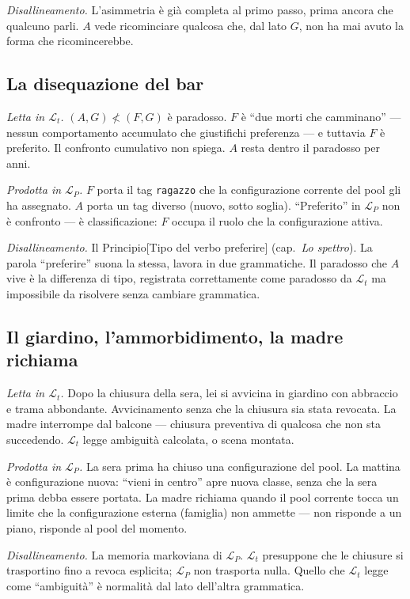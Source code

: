 \documentclass[
    oneside,                 %
    openany,                 %
    titlepage,
    11pt,
    a4paper,
    italian,
    DIV=14,                  %
    headinclude,
    footinclude=true,
    cleardoublepage=empty
]{scrbook}
\theoremstyle{ctplain}
\theoremstyle{ctdef}
\theoremstyle{ctrem}
\newcommand{\Lt}{\mathcal{L}_t}
\newcommand{\LP}{\mathcal{L}_P}
\begin{document}
\emph{Disallineamento.} L'asimmetria è già completa al primo passo, prima ancora che qualcuno parli. $A$ vede ricominciare qualcosa che, dal lato $G$, non ha mai avuto la forma che ricomincerebbe.

\subsection*{La disequazione del bar}

\emph{Letta in $\Lt$.} $(A,G) \not< (F,G)$ è paradosso. $F$ è ``due morti che camminano'' --- nessun comportamento accumulato che giustifichi preferenza --- e tuttavia $F$ è preferito. Il confronto cumulativo non spiega. $A$ resta dentro il paradosso per anni.

\emph{Prodotta in $\LP$.} $F$ porta il tag \texttt{ragazzo} che la configurazione corrente del pool gli ha assegnato. $A$ porta un tag diverso (nuovo, sotto soglia). ``Preferito'' in $\LP$ non è confronto --- è classificazione: $F$ occupa il ruolo che la configurazione attiva.

\emph{Disallineamento.} Il Principio[Tipo del verbo preferire] (cap.~\emph{Lo spettro}). La parola ``preferire'' suona la stessa, lavora in due grammatiche. Il paradosso che $A$ vive è la differenza di tipo, registrata correttamente come paradosso da $\Lt$ ma impossibile da risolvere senza cambiare grammatica.

\subsection*{Il giardino, l'ammorbidimento, la madre richiama}

\emph{Letta in $\Lt$.} Dopo la chiusura della sera, lei si avvicina in giardino con abbraccio e trama abbondante. Avvicinamento senza che la chiusura sia stata revocata. La madre interrompe dal balcone --- chiusura preventiva di qualcosa che non sta succedendo. $\Lt$ legge ambiguità calcolata, o scena montata.

\emph{Prodotta in $\LP$.} La sera prima ha chiuso una configurazione del pool. La mattina è configurazione nuova: ``vieni in centro'' apre nuova classe, senza che la sera prima debba essere portata. La madre richiama quando il pool corrente tocca un limite che la configurazione esterna (famiglia) non ammette --- non risponde a un piano, risponde al pool del momento.

\emph{Disallineamento.} La memoria markoviana di $\LP$. $\Lt$ presuppone che le chiusure si trasportino fino a revoca esplicita; $\LP$ non trasporta nulla. Quello che $\Lt$ legge come ``ambiguità'' è normalità dal lato dell'altra grammatica.
\end{document}
